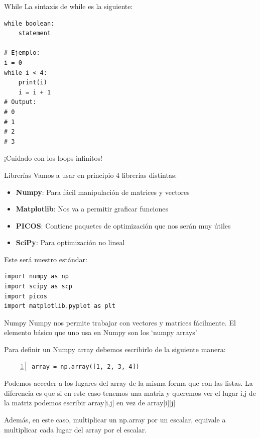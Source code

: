 \documentclass{beamer}
\begin{document}
\begin{frame}[fragile]{While}
La sintaxis de while es la siguiente:

\begin{lstlisting}
while boolean:
    statement

# Ejemplo:
i = 0
while i < 4:
    print(i)
    i = i + 1
# Output:
# 0
# 1
# 2
# 3
\end{lstlisting}

¡Cuidado con los loops infinitos!
\end{frame}

\begin{frame}[fragile]{Librerías}
Vamos a usar en principio 4 librerías distintas:

\begin{itemize}
    \item \textbf{Numpy}: Para fácil manipulación de matrices y vectores
    \item \textbf{Matplotlib}: Nos va a permitir graficar funciones
    \item \textbf{PICOS}: Contiene paquetes de optimización que nos serán muy útiles
    \item \textbf{SciPy}: Para optimización no lineal
\end{itemize}

Este será nuestro estándar:
\begin{lstlisting}
import numpy as np
import scipy as scp
import picos
import matplotlib.pyplot as plt
\end{lstlisting}
\end{frame}

\begin{frame}[fragile]{Numpy}
Numpy nos permite trabajar con vectores y matrices fácilmente. El elemento básico que uno usa en Numpy son los `numpy arrays'

Para definir un Numpy array debemos escribirlo de la siguiente manera:

\begin{lstlisting}[numbers=left, numbersep=5pt]
array = np.array([1, 2, 3, 4])
\end{lstlisting}

Podemos acceder a los lugares del array de la misma forma que con las listas. La diferencia es que si en este caso tenemos una matriz y queremos ver el lugar i,j de la matriz podemos escribir array[i,j] en vez de array[i][j]

Además, en este caso, multiplicar un np.array por un escalar, equivale a multiplicar cada lugar del array por el escalar.
\end{frame}
\end{document}
